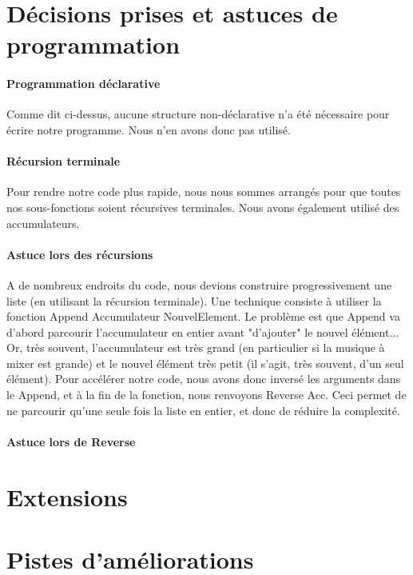 \documentclass[12pt,a4paper]{article}
\begin{document}
\section{Décisions prises et astuces de programmation}
\paragraph{Programmation déclarative} Comme dit ci-dessus, aucune structure non-déclarative 
n'a été nécessaire pour écrire notre programme. Nous n'en avons donc pas utilisé.

\paragraph{Récursion terminale}
Pour rendre notre code plus rapide, nous nous sommes arrangés pour que toutes nos sous-fonctions
 soient récursives terminales. Nous avons également utilisé des accumulateurs.

\paragraph{Astuce lors des récursions}
A de nombreux endroits du code, nous devions construire progressivement une liste 
(en utilisant la récursion terminale). Une technique consiste à utiliser la fonction
{Append Accumulateur NouvelElement}. Le problème est que Append va d'abord parcourir
l'accumulateur en entier avant "d'ajouter" le nouvel élément... Or, très souvent, 
l'accumulateur est très grand (en particulier si la musique à mixer est grande) et 
le nouvel élément très petit (il s'agit, très souvent, d'un seul élément). Pour accélérer
notre code, nous avons donc inversé les arguments dans le Append, et à la fin de la 
fonction, nous renvoyons {Reverse Acc}. Ceci permet de ne parcourir qu'une seule fois 
la liste en entier, et donc de réduire la complexité.

\paragraph{Astuce lors de Reverse}


\section{Extensions}
\section{Pistes d'améliorations}
\end{document}
